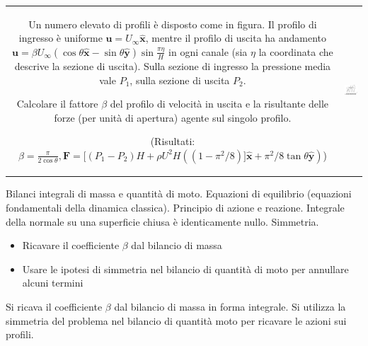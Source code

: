 \noindent
\begin{tabular}{cc}
\begin{minipage}{0.45\textwidth}
\begin{exerciseS}
Un numero elevato di profili è disposto come in figura. Il profilo di ingresso
è uniforme $\bm{u} = U_\infty \bm{\hat{x}}$, mentre il profilo di uscita ha andamento
$\bm{u} = \beta U_\infty (\cos \theta \bm{\hat{x}} - \sin \theta \bm{\hat{y}})
\sin{\frac{\pi \eta}{H}}$ in ogni canale (sia $\eta$ la coordinata che descrive la
sezione di uscita).
Sulla sezione di ingresso la pressione media vale $P_1$, sulla sezione di uscita
 $P_2$. 

Calcolare il fattore $\beta$ del profilo di velocità in uscita e la risultante delle
 forze (per unità di apertura) agente sul singolo profilo.

(Risultati: $\beta = \frac{\pi}{2 \cos \theta}, \bm{F} = [(P_1 - P_2) H + \rho U^2 H ((1-\pi^2/8) ]\bm{\hat{x}} + \pi^2/8 \tan \theta \bm{\hat{y}}) $)
\end{exerciseS}
\end{minipage}
&
\begin{minipage}{0.50\textwidth}
   \begin{center}
   \includegraphics[width=0.95\textwidth]{./fig/wings.eps}
   \end{center}
\end{minipage}
\end{tabular}

\vspace{1.0cm}

\sol

\partone
  Bilanci integrali di massa e quantità di moto. Equazioni di equilibrio (equazioni fondamentali della dinamica classica). Principio di azione e reazione. Integrale della normale su una superficie chiusa è identicamente nullo. Simmetria.
\begin{itemize}
  \item Ricavare il coefficiente $\beta$ dal bilancio di massa
  \item Usare le ipotesi di simmetria nel bilancio di quantità di moto per annullare alcuni termini
\end{itemize} 

\parttwo

Si ricava il coefficiente $\beta$ dal bilancio di massa in forma integrale. Si utilizza la simmetria del problema nel bilancio di quantità moto per
 ricavare le azioni sui profili.

